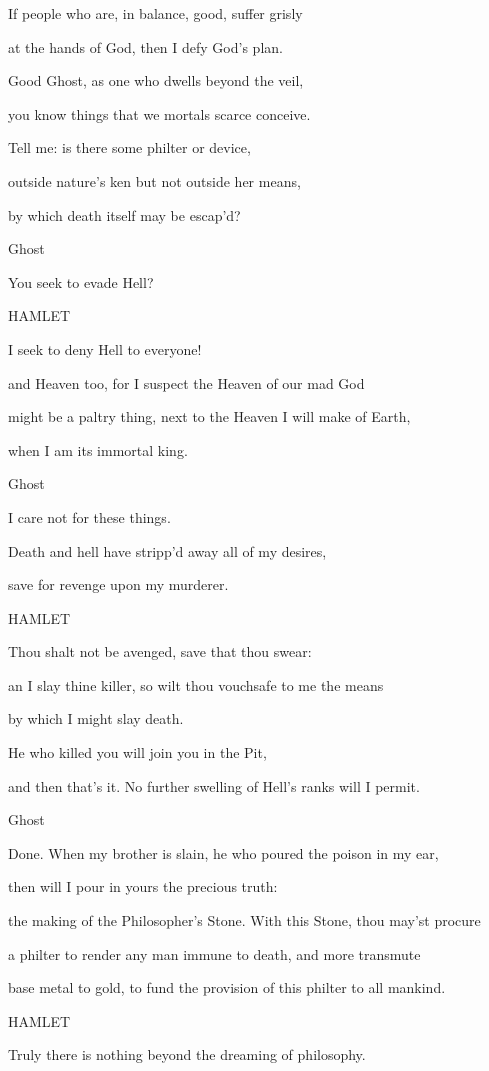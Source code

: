If people who are, in balance, good, suffer grisly

at the hands of God, then I defy God's plan.

Good Ghost, as one who dwells beyond the veil,

you know things that we mortals scarce conceive.

Tell me: is there some philter or device,

outside nature's ken but not outside her means,

by which death itself may be escap'd?

Ghost

You seek to evade Hell?

HAMLET

I seek to deny Hell to everyone!

and Heaven too, for I suspect the Heaven of our mad God

might be a paltry thing, next to the Heaven I will make of Earth,

when I am its immortal king.

Ghost

I care not for these things.

Death and hell have stripp'd away all of my desires,

save for revenge upon my murderer.

HAMLET

Thou shalt not be avenged, save that thou swear:

an I slay thine killer, so wilt thou vouchsafe to me the means

by which I might slay death.

He who killed you will join you in the Pit,

and then that's it. No further swelling of Hell's ranks will I permit.

Ghost

Done. When my brother is slain, he who poured the poison in my ear,

then will I pour in yours the precious truth:

the making of the Philosopher's Stone. With this Stone, thou may'st procure

a philter to render any man immune to death, and more transmute

base metal to gold, to fund the provision of this philter to all mankind.

HAMLET

Truly there is nothing beyond the dreaming of philosophy.

